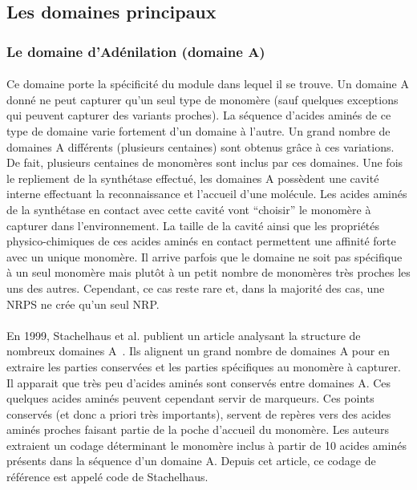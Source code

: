 \documentclass[12pt,french,twoside]{report}
\begin{document}
\subsection{Les domaines principaux}

\subsubsection{Le domaine d'Adénilation (domaine A)}

\paragraph{}Ce domaine porte la spécificité du module dans lequel il se trouve.
Un domaine A donné ne peut capturer qu'un seul type de monomère (sauf quelques exceptions qui peuvent capturer des variants proches).
La séquence d'acides aminés de ce type de domaine varie fortement d'un domaine à l'autre.
Un grand nombre de domaines A différents (plusieurs centaines) sont obtenus grâce à ces variations.
De fait, plusieurs centaines de monomères sont inclus par ces domaines.
Une fois le repliement de la synthétase effectué, les domaines A possèdent une cavité interne effectuant la reconnaissance et l'accueil d'une molécule.
Les acides aminés de la synthétase en contact avec cette cavité vont ``choisir'' le monomère à capturer dans l'environnement.
La taille de la cavité ainsi que les propriétés physico-chimiques de ces acides aminés en contact permettent une affinité forte avec un unique monomère.
Il arrive parfois que le domaine ne soit pas spécifique à un seul monomère mais plutôt à un petit nombre de monomères très proches les uns des autres.
Cependant, ce cas reste rare et, dans la majorité des cas, une NRPS ne crée qu'un seul NRP.

\paragraph{}En 1999, Stachelhaus et al. publient un article analysant la structure de nombreux domaines A~\cite{stachelhaus_specificity-conferring_1999}.
Ils alignent un grand nombre de domaines A pour en extraire les parties conservées et les parties spécifiques au monomère à capturer.
Il apparait que très peu d'acides aminés sont conservés entre domaines A.
Ces quelques acides aminés peuvent cependant servir de marqueurs.
Ces points conservés (et donc a priori très importants), servent de repères vers des acides aminés proches faisant partie de la poche d'accueil du monomère.
Les auteurs extraient un codage déterminant le monomère inclus à partir de 10 acides aminés présents dans la séquence d'un domaine A.
Depuis cet article, ce codage de référence est appelé code de Stachelhaus.
\end{document}
